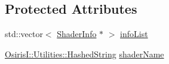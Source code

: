 \subsection*{Protected Attributes}
\begin{DoxyCompactItemize}
\item 
std\-::vector$<$ \hyperlink{struct_osiris_i_1_1_graphics_1_1_shader_1_1_shader_info}{Shader\-Info} $\ast$ $>$ \hyperlink{class_osiris_i_1_1_graphics_1_1_shader_1_1_i_shader_a6620a0e6eab9ce30f098375f8da41761}{info\-List}
\item 
\hyperlink{class_osiris_i_1_1_utilities_1_1_hashed_string}{Osiris\-I\-::\-Utilities\-::\-Hashed\-String} \hyperlink{class_osiris_i_1_1_graphics_1_1_shader_1_1_i_shader_a0f2d4323ae9304e517f9649831ad7231}{shader\-Name}
\end{DoxyCompactItemize}


